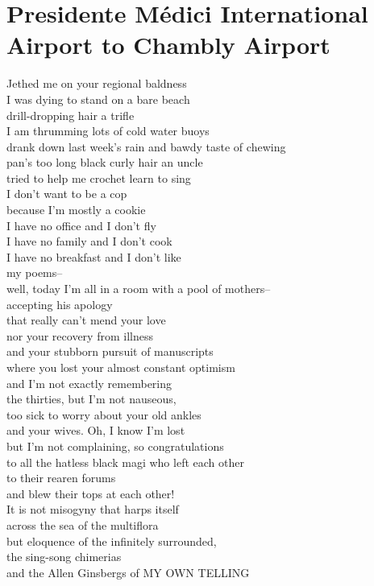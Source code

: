 \documentclass[smalldemyvopaper,11pt,twoside,onecolumn,openright,extrafontsizes]{memoir}
\newlength\drop
\begin{document}
\chapter{Presidente Médici International Airport to Chambly Airport}
Jethed me on your regional baldness
\\I was dying to stand on a bare beach
\\drill-dropping hair a trifle
\\I am thrumming lots of cold water buoys
\\drank down last week's rain and bawdy taste of chewing
\\pan's too long black curly hair an uncle
\\tried to help me crochet learn to sing
\\I don't want to be a cop
\\because I'm mostly a cookie
\\I have no office and I don't fly
\\I have no family and I don't cook
\\I have no breakfast and I don't like
\\my poems--
\\well, today I'm all in a room with a pool of mothers--
\\accepting his apology
\\that really can't mend your love
\\nor your recovery from illness
\\and your stubborn pursuit of manuscripts
\\where you lost your almost constant optimism
\\and I'm not exactly remembering
\\the thirties, but I'm not nauseous,
\\too sick to worry about your old ankles
\\and your wives. Oh, I know I'm lost
\\but I'm not complaining, so congratulations
\\to all the hatless black magi who left each other
\\to their rearen forums
\\and blew their tops at each other!
\\It is not misogyny that harps itself
\\across the sea of the multiflora
\\but eloquence of the infinitely surrounded,
\\the sing-song chimerias
\\and the Allen Ginsbergs of MY OWN TELLING
\end{document}
